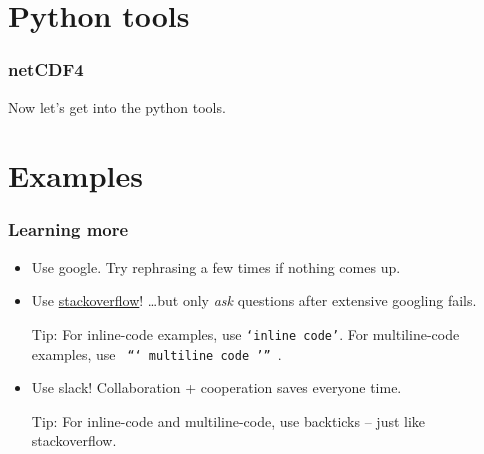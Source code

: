 \documentclass[aspectratio=169]{beamer}
\begin{document}
\section{Python tools}

\begin{frame}
  \frametitle{netCDF4}

  Now let's get into the python tools.

\end{frame}


\section{Examples}

\begin{frame}
  \frametitle{Learning more}
  \begin{itemize}
    \item
      Use google. Try rephrasing a few times if nothing comes up.
    \item
      Use \href{https://stackoverflow.com}{stackoverflow}!
      \ldots but only \textit{ask} questions after extensive googling fails.

      Tip: For inline-code examples, use \texttt{`inline code'}. For multiline-code
      examples, use \texttt{%
      ```\\
      multiline code\\
      '''%
      }.
    \item
      Use slack!
      Collaboration + cooperation saves everyone time.

      Tip:
      For inline-code and multiline-code, use backticks --
      just like stackoverflow.
  \end{itemize} 
\end{frame}
\end{document}
